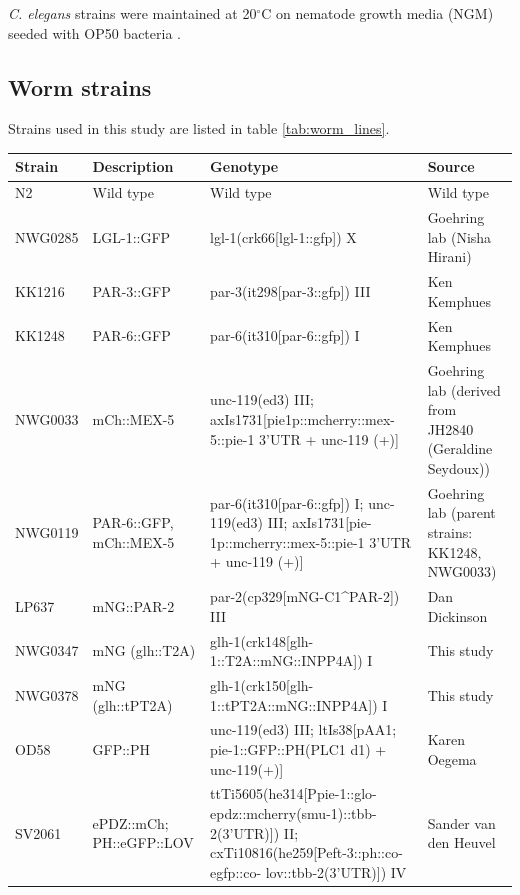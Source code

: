 \documentclass[12pt]{"report"}
\begin{document}
\textit{C. elegans} strains were maintained at 20$^{\circ}$C on nematode growth media (NGM) seeded with OP50 bacteria \citep{Stiernagle2006}. 


\subsection{Worm strains}

Strains used in this study are listed in table \ref{tab:worm_lines}.\\


\begin{longtabu} to 
    
\hline
\textbf{Strain} & \textbf{Description} & \textbf{Genotype} & \textbf{Source} \\ \hline
\endhead
%
N2 & Wild type & Wild type & Wild type \\ \hline
NWG0285 & LGL-1::GFP & lgl-1(crk66{[}lgl-1::gfp{]}) X & Goehring lab (Nisha Hirani) \\ \hline
KK1216 & PAR-3::GFP & par-3(it298{[}par-3::gfp{]}) III & Ken Kemphues \\ \hline
KK1248 & PAR-6::GFP & par-6(it310{[}par-6::gfp{]}) I & Ken Kemphues \\ \hline
NWG0033 & mCh::MEX-5 & unc-119(ed3) III; axIs1731{[}pie1p::mcherry::mex-5::pie-1 3'UTR + unc-119   (+){]} & Goehring lab (derived from JH2840 (Geraldine Seydoux)) \\ \hline
NWG0119 & PAR-6::GFP, mCh::MEX-5 & par-6(it310{[}par-6::gfp{]}) I; unc-119(ed3) III;   axIs1731{[}pie-1p::mcherry::mex-5::pie-1 3'UTR + unc-119 (+){]} & Goehring lab (parent strains: KK1248, NWG0033) \\ \hline
LP637 & mNG::PAR-2 & par-2(cp329{[}mNG-C1\textasciicircum{}PAR-2{]}) III & Dan Dickinson \\ \hline
NWG0347 & mNG (glh::T2A) & glh-1(crk148{[}glh-1::T2A::mNG::INPP4A{]}) I & This study \\ \hline
NWG0378 & mNG (glh::tPT2A) & glh-1(crk150{[}glh-1::tPT2A::mNG::INPP4A{]}) I & This study \\ \hline
OD58 & GFP::PH & unc-119(ed3) III; ltIs38{[}pAA1; pie-1::GFP::PH(PLC1 d1) + unc-119(+){]} & Karen Oegema \\ \hline
SV2061 & ePDZ::mCh;   PH::eGFP::LOV & ttTi5605(he314{[}Ppie-1::glo-epdz::mcherry(smu-1)::tbb-2(3'UTR){]})   II; cxTi10816(he259{[}Peft-3::ph::co-egfp::co- lov::tbb-2(3'UTR){]}) IV & Sander van den Heuvel \\ \hline

\end{longtabu}
\end{document}
